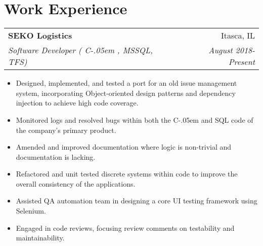 \documentclass[letterpaper,11pt]{article}
\makeatletter
\newcommand{\resumeItem}[2]{
    \vspace{-2pt}
    \item\small{
        \textbf{#1}{ #2 \vspace{-2pt}}
    }
}
\newcommand{\resumeSubheading}[4]{
        \begin{tabular*}{0.97\textwidth}{l@{\extracolsep{\fill}}r}
            \textbf{#1} & #2 \\
            \textit{\small#3} & \textit{\small #4} \\
        \end{tabular*}
}
\newcommand{\resumeSubHeadingListStart}{}
\newcommand{\resumeSubHeadingListEnd}{}
\newcommand{\resumeItemListStart}{\begin{itemize}}
\newcommand{\resumeItemListEnd}{\end{itemize}}
\newcommand{\Csharp}{%
  {\settoheight{\dimen0}{C}C\kern-.05em \resizebox{!}{\dimen0}{\raisebox{\depth}{\#}}}}
\makeatother
\begin{document}
\section{\textbf{Work Experience}}
    \resumeSubHeadingListStart
        \resumeSubheading
            {SEKO Logistics}{Itasca, IL}
            {Software Developer (\Csharp, MSSQL, TFS)}{August 2018-Present}
            \resumeItemListStart
                \resumeItem{}
                    {
                        Designed, implemented, and tested a port for
                        an old issue management system, incorporating Object-oriented
                        design patterns and dependency injection to achieve high code coverage.
                    }
                \resumeItem{}
                    {
                        Monitored logs and resolved bugs within both the
                        \Csharp \space and SQL code of the company's primary product.
                    }
                \resumeItem{}
                    {
                        Amended and improved documentation where logic
                        is non-trivial and documentation is lacking.
                    }
                \resumeItem{}
                    {
                        Refactored and unit tested discrete systems
                        within code to improve the overall consistency
                        of the applications.
                    }
                \resumeItem{}
                    {
                        Assisted QA automation team in designing a core UI testing framework using Selenium.
                    }
                \resumeItem{}
                    {
                        Engaged in code reviews,
                        focusing review comments on testability and maintainability.
                    }
            \resumeItemListEnd
    \resumeSubHeadingListEnd
\end{document}
